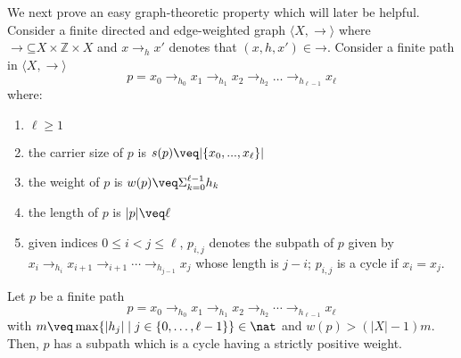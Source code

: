 We next prove an easy graph-theoretic property which will later be
helpful.
Consider a finite directed and edge-weighted graph
\(\langle X,\to\rangle\) where
\(\to \mathord{\subseteq} X \times \mathbb{Z} \times X\) and
\(x \to_h x'\) denotes that \((x, h, x') \in \mathbin{\to}\). Consider
a finite path in \(\langle X,\to\rangle\)
\[p= x_0 \to_{h_0} x_1 \to_{h_1} x_2 \to_{h_2} \ldots \to_{h_{\ell-1}}
  x_{\ell}\] where:
\begin{enumerate}[label=(\roman*).]
\item \(\ell\geq 1\)
\item the carrier size of \(p\) is \(s(p) \veq |\{x_0,...,x_\ell\}|\)
\item the weight of \(p\) is \(w(p) \veq \Sigma_{k=0}^{\ell-1} h_k\)
\item the length of \(p\) is \(|p|\veq \ell\)
\item given indices \(0 \leq i < j \leq \ell\), \(p_{i,j}\) denotes
  the subpath of \(p\) given by
  \(x_i \to_{h_i} x_{i+1} \to_{i+1} \cdots \to_{h_{j-1}} x_j\) whose
  length is \(j-i\); \(p_{i,j}\) is a cycle if \(x_i=x_j\).
\end{enumerate}



\begin{lemma}
  \label{le:cycles}
  Let \(p\) be a finite path
  \[p = x_0 \to_{h_0} x_1 \to_{h_1} x_2 \to_{h_2} \cdots \to_{h_{\ell-1}} x_{\ell}\]
  with
  \(m \veq \max \{ |h_j| \mid j \in \{0, \ldots, \ell-1\}\}\in \nat\) and 
  \(w(p) > (|X|-1)m\). Then, \(p\) has a subpath which is a cycle having a 
  strictly positive weight.
\end{lemma}

